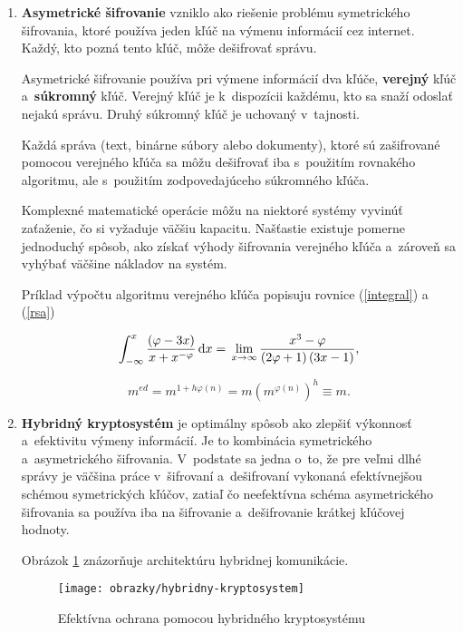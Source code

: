 \begin{enumerate}
\item \textbf{Asymetrické šifrovanie} vzniklo ako riešenie problému symetrického šifrovania, ktoré používa jeden kľúč na výmenu informácií cez internet. Každý, kto pozná tento kľúč, môže dešifrovať správu.

Asymetrické šifrovanie používa pri výmene informácií dva kľúče, \textbf{verejný} kľúč a~\textbf{súkromný} kľúč. Verejný kľúč je k~dispozícii každému, kto sa snaží odoslať nejakú správu. Druhý súkromný kľúč je uchovaný v~tajnosti. 

Každá správa (text, binárne súbory alebo dokumenty), ktoré sú zašifrované pomocou verejného kľúča sa môžu dešifrovať iba s~použitím rovnakého algoritmu, ale s~použitím zodpovedajúceho súkromného kľúča.

Komplexné matematické operácie môžu na niektoré systémy vyvinúť zaťaženie, čo si vyžaduje väčšiu kapacitu. Našťastie existuje pomerne jednoduchý spôsob, ako získať výhody šifrovania verejného kľúča a~zároveň sa vyhýbať väčšine nákladov na systém.

Príklad výpočtu algoritmu verejného kľúča popisuju rovnice (\ref{integral}) a (\ref{rsa})



\begin{equation}
\label{integral}
	\int_{-\infty}^{x} \frac{\left(\varphi - 3x\right)}{x + x^{-\varphi}} \, \mathrm d x=\, 
	\lim_{x\rightarrow \infty} \frac{x^3-\varphi}{\left(2 \varphi + 1\right) \left(3x -1\right)},
\end{equation}

\begin{equation}
\label{rsa}
 	m^{ed} = m^{1+h \varphi(n)} = m(m^{\varphi(n)})^h \equiv m.
\end{equation}

\item \textbf{Hybridný kryptosystém} je optimálny spôsob ako zlepšiť výkonnosť a~efektivitu výmeny informácií. Je to kombinácia symetrického a~asymetrického šifrovania. V~podstate sa jedna o~to, že pre veľmi dlhé správy je väčšina práce v~šifrovaní a~de\-šifro\-va\-ní vykonaná efektívnejšou schémou symetrických kľúčov, zatiaľ čo neefektívna schéma asymetrického šifrovania sa používa iba na šifrovanie a~dešifrovanie krátkej kľúčovej hodnoty.

Obrázok \ref{hybridny-kryptosystem} znázorňuje architektúru hybridnej komunikácie.

\begin{figure}[!h]
    \centering
    \texttt{[image: obrazky/hybridny-kryptosystem]}
    \caption{Efektívna ochrana pomocou hybridného kryptosystému}
    \label{hybridny-kryptosystem}
\end{figure}

\end{enumerate}


